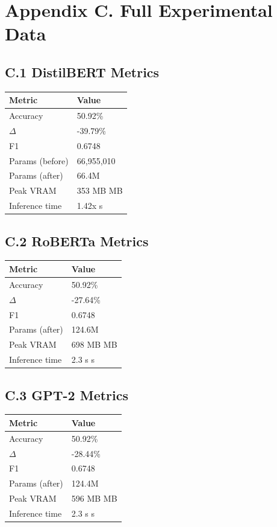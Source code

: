 \section{Appendix C. Full Experimental Data}

\subsection{C.1 DistilBERT Metrics}

\begin{table}[H]
\centering
\small
\begin{tabular}{ll}
\toprule
\textbf{Metric} & \textbf{Value} \\
\midrule
Accuracy & 50.92\% \\
$\Delta$ & -39.79\% \\
F1 & 0.6748 \\
Params (before) & 66,955,010 \\
Params (after) & 66.4M \\
Peak VRAM & 353 MB MB \\
Inference time & 1.42x s \\
\bottomrule
\end{tabular}
\end{table}

\subsection{C.2 RoBERTa Metrics}

\begin{table}[H]
\centering
\small
\begin{tabular}{ll}
\toprule
\textbf{Metric} & \textbf{Value} \\
\midrule
Accuracy & 50.92\% \\
$\Delta$ & -27.64\% \\
F1 & 0.6748 \\
Params (after) & 124.6M \\
Peak VRAM & 698 MB MB \\
Inference time & 2.3 s s \\
\bottomrule
\end{tabular}
\end{table}

\subsection{C.3 GPT-2 Metrics}

\begin{table}[H]
\centering
\small
\begin{tabular}{ll}
\toprule
\textbf{Metric} & \textbf{Value} \\
\midrule
Accuracy & 50.92\% \\
$\Delta$ & -28.44\% \\
F1 & 0.6748 \\
Params (after) & 124.4M \\
Peak VRAM & 596 MB MB \\
Inference time & 2.3 s s \\
\bottomrule
\end{tabular}
\end{table}

